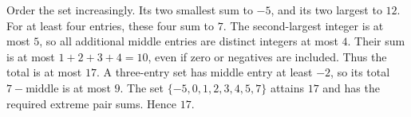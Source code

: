 Order the set increasingly. Its two smallest sum to $-5$, and its two largest to $12$. For at least four entries, these four sum to $7$. The second-largest integer is at most $5$, so all additional middle entries are distinct integers at most $4$. Their sum is at most $1+2+3+4=10$, even if zero or negatives are included. Thus the total is at most $17$. A three-entry set has middle entry at least $-2$, so its total $7-\text{middle}$ is at most $9$. The set $\{-5,0,1,2,3,4,5,7\}$ attains $17$ and has the required extreme pair sums. Hence $\boxed{17}$.
